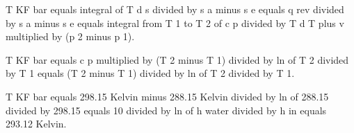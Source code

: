T KF bar equals integral of T d s divided by s a minus s e equals q rev divided by s a minus s e equals integral from T 1 to T 2 of c p divided by T d T plus v multiplied by (p 2 minus p 1).  

T KF bar equals c p multiplied by (T 2 minus T 1) divided by ln of T 2 divided by T 1 equals (T 2 minus T 1) divided by ln of T 2 divided by T 1.  

T KF bar equals 298.15 Kelvin minus 288.15 Kelvin divided by ln of 288.15 divided by 298.15 equals 10 divided by ln of h water divided by h in equals 293.12 Kelvin.